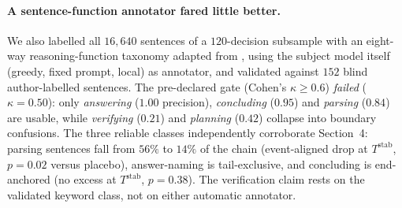 \documentclass{article}
\newcommand{\Tstab}{T^{\mathrm{stab}}}
\begin{document}
\paragraph{A sentence-function annotator fared little better.} We also labelled all
$16{,}640$ sentences of a $120$-decision subsample with an eight-way reasoning-function
taxonomy adapted from \citet{anchors2025}, using the subject model itself
(greedy, fixed prompt, local) as annotator, and validated against $152$ blind
author-labelled sentences. The pre-declared gate (Cohen's $\kappa \ge 0.6$) \emph{failed}
($\kappa = 0.50$): only \emph{answering} ($1.00$ precision), \emph{concluding} ($0.95$)
and \emph{parsing} ($0.84$) are usable, while \emph{verifying} ($0.21$) and
\emph{planning} ($0.42$) collapse into boundary confusions. The three reliable classes
independently corroborate Section~4: parsing sentences fall from $56\%$ to $14\%$ of
the chain (event-aligned drop at $\Tstab$, $p = 0.02$ versus placebo), answer-naming is
tail-exclusive, and concluding is end-anchored (no excess at $\Tstab$, $p = 0.38$).
The verification claim rests on the validated keyword class, not on either automatic
annotator.
\end{document}
